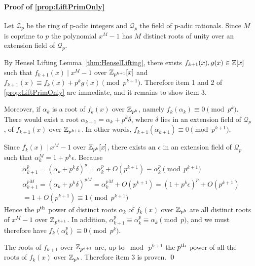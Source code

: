 \paragraph{\bf Proof of \cref{prop:LiftPrimOnly}}
\begin{ext_proof}\label{proof:LiftPrimOnly} 
    Let \(\mathcal{Z}_p\) be the ring of p-adic integers and \(\mathcal{Q}_p\) the field of p-adic rationals. Since \(M\) is coprime to \(p\) the polynomial \(x^M - 1\) has \(M\) distinct roots of unity over an extension field of \(\mathcal{Q}_p\).

    By Hensel Lifting Lemma~\cref{thm:HenselLifting}, there exists \(f_{k+1}(x), g(x) \in \mathbb{Z}[x]\) such that \(f_{k+1}(x) \mid x^M - 1\) over \(\mathbb{Z}_{p^{k+1}}[x]\) and \(f_{k+1}(x) \equiv f_k(x) + p^k g(x) \pmod{p^{k+1}}\). Therefore item 1 and 2 of \cref{prop:LiftPrimOnly} are immediate, and it remains to show item 3.

    Moreover, if \(\alpha_k\) is a root of \(f_k(x)\) over \(\mathbb{Z}_{p^k}\), namely \(f_k(\alpha_k) \equiv 0 \pmod{p^k}\). There would exist a root \(\alpha_{k+1} = \alpha_k + p^k \delta\), where \(\delta\) lies in an extension field of \(\mathcal{Q}_p\), of \(f_{k+1}(x)\) over \(\mathbb{Z}_{p^{k+1}}\). In other words, \(f_{k+1}(\alpha_{k+1}) \equiv 0 \pmod{p^{k+1}}\).

    Since \(f_k(x) \mid x^M - 1\) over \(\mathbb{Z}_{p^k}[x]\), there exists an \(\epsilon\) in an extension field of \(\mathcal{Q}_p\) such that \(\alpha_k^M = 1 + p^k \epsilon\). Because
    \begin{align*}
        &\alpha_{k+1}^p = (\alpha_k + p^k \delta)^p = \alpha_k^p + O(p^{k+1}) \equiv \alpha_k^p \pmod{p^{k+1}} \\
        &\alpha_{k+1}^{pM} = (\alpha_k + p^k \delta)^{pM} = \alpha_k^{pM} + O(p^{k+1}) = (1 + p^k \epsilon)^p + O(p^{k+1}) \\
        &= 1 + O(p^{k+1}) \equiv 1 \pmod{p^{k+1}}
    \end{align*}
    Hence the \(p\textsuperscript{th}\) power of distinct roots \(\alpha_k\) of \(f_k(x)\) over \(\mathbb{Z}_{p^k}\) are all distinct roots of \(x^M - 1\) over \(\mathbb{Z}_{p^{k+1}}\). In addition, \(\alpha_{k+1}^p \equiv \alpha_k^p \equiv \alpha_k \pmod{p}\), and we must therefore have \(f_k(\alpha_k^p) \equiv 0 \pmod{p^k}\).

    The roots of \(f_{k+1}\) over \(\mathbb{Z}_{p^{k+1}}\) are, up to \(\bmod \  p^{k+1}\) the \(p\textsuperscript{th}\) power of all the roots of \(f_k(x)\) over \(\mathbb{Z}_{p^k}\). Therefore item 3 is proven. \hfill \qed
\end{ext_proof}

